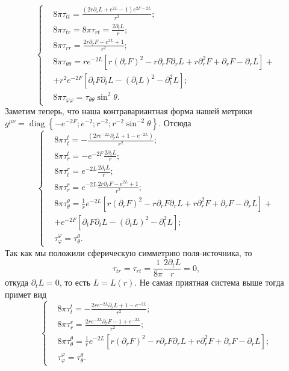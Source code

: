 \documentclass[a4paper, 14pt]{scrarticle}
\theoremstyle{Imperial}
\begin{document}
	$$\left\lbrace \begin{aligned}
		&8\pi\tau_{tt} = \frac{\left(2 r \partial_r L + e^{2 L} - 1 \right) e^{2 F- 2 L}}{r^2};\\
		&8\pi\tau_{tr} = 8\pi\tau_{rt} = \frac{2 \partial_t L}{r};\\
		&8\pi\tau_{rr} = \frac{2 r \partial_r F- e^{2 L} + 1}{r^2};\\
		&8\pi\tau_{\theta\theta} = re^{-2L}\left[r\left(\partial_{r}F\right)^{2}-r\partial_{r}F\partial_{r}L+r\partial_{r}^{2}F+\partial_{r}F-\partial_{r}L\right]+\\
		&+r^{2}e^{-2F}\left[\partial_{t}F\partial_{t}L-\left(\partial_{t}L\right)^{2}-\partial_{t}^{2}L\right];\\
		&8\pi\tau_{\varphi\varphi} =\tau_{\theta\theta} \sin^2 \theta.
	\end{aligned}\right.$$
	Заметим теперь, что наша контравариантная форма нашей метрики $g^{\mu\nu} = \operatorname{diag}\left\lbrace -e^{-2F}; e^{-2}; r^{-2}; r^{-2}\sin^{-2}\theta \right\rbrace$. Отсюда
	$$\left\lbrace \begin{aligned}
		&8\pi\tau^t_t = - \frac{\left(2 r e^{-2L} \partial_r L + 1 - e^{-2L} \right)}{r^2};\\
		&8\pi\tau^t_r = - e^{-2F} \frac{2 \partial_t L}{r};\\
		&8\pi\tau^r_t = e^{-2L} \frac{2 \partial_t L}{r};\\
		&8\pi\tau^r_r = e^{-2L} \frac{2 r \partial_r F- e^{2 L} + 1}{r^2};\\
		&8\pi\tau^\theta_\theta = \frac{1}{r}e^{-2L}\left[r\left(\partial_{r}F\right)^{2}-r\partial_{r}F\partial_{r}L+r\partial_{r}^{2}F+\partial_{r}F-\partial_{r}L\right]+\\
		&+e^{-2F}\left[\partial_{t}F\partial_{t}L-\left(\partial_{t}L\right)^{2}-\partial_{t}^{2}L\right];\\
		&\tau^\varphi_\varphi =\tau^\theta_\theta.
	\end{aligned}\right.$$
	Так как мы положили сферическую симметрию поля-источника, то 
	$$\tau_{tr} = \tau_{rt} = \frac{1}{8\pi} \frac{2 \partial_t L}{r}=0,$$ 
	откуда $\partial_t L = 0$, то есть $L = L(r)$. Не самая приятная система выше тогда примет вид
	$$\left\lbrace \begin{aligned}
		&8\pi \tau^t_t = - \frac{2 r e^{-2L} 	\partial_r L + 1 - e^{-2L}}{r^2};\\
		&8\pi \tau^r_r = \frac{2 r e^{-2L} \partial_r F - 1 + e^{-2L}}{r^2};\\
		&8\pi \tau^\theta_\theta = \frac{1}{r}e^{-2L}\left[r\left(\partial_{r}F\right)^{2}-r\partial_{r}F\partial_{r}L+r\partial_{r}^{2}F+\partial_{r}F-\partial_{r}L\right];\\
		&\tau^\varphi_\varphi =\tau^\theta_\theta.
	\end{aligned}\right.$$	
\end{document}
